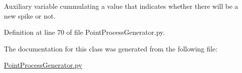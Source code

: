 Auxiliary variable cummulating a value that indicates whether there will be a new spike or not. 



Definition at line 70 of file Point\-Process\-Generator.\-py.



The documentation for this class was generated from the following file\-:\begin{DoxyCompactItemize}
\item 
\hyperlink{_point_process_generator_8py}{Point\-Process\-Generator.\-py}\end{DoxyCompactItemize}
